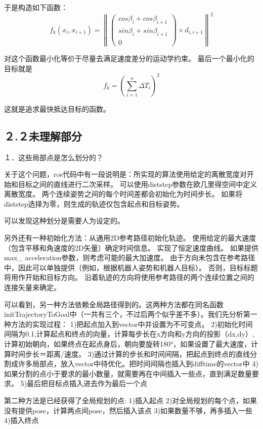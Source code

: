\documentclass[10pt,a4paper]{article}
\theoremstyle{mythm}
\numberwithin{equation}{section}
\begin{document}
于是构造如下函数：
\begin{equation}
f_k(x_i,x_{i+1})=\left\|
\left(
	\begin{array}{lr}
	cos\beta_i+cos\beta_{i+1}\\
	sin\beta_i+sin\beta_{i+1}\\
	0\end{array}
\right)\times d_{i,i+1}\right\|^2
\label{eq:point_constrain}
\end{equation}

对这个函数最小化等价于尽量去满足速度差分的运动学约束。
最后一个最小化的目标就是
$$
f_k=\left(\sum_{i=1}^{n}\Delta T_i\right)^2
$$

这就是追求最快抵达目标的函数。
\subsection{２.２未理解部分}
１．这些局部点是怎么划分的？

关于这个问题，ros代码中有一段说明是：所实现的算法使用给定的离散宽度对开始和目标之间的直线进行二次采样。 可以使用diststep参数在欧几里得空间中定义离散宽度。 两个连续姿势之间的每个时间差都会初始化为时间步长。 如果将diststep选择为零，则生成的轨迹仅包含起点和目标姿势。

可以发现这种划分是需要人为设定的。

另外还有一种初始化方法：从通用2D参考路径初始化轨迹。 使用给定的最大速度（包含平移和角速度的2D矢量）确定时间信息。 实现了恒定速度曲线。 如果提供max\_ acceleration参数，则考虑可能的最大加速度。 由于方向未包含在参考路径中，因此可以单独提供（例如，根据机器人姿势和机器人目标）。 否则，目标标题将用作开始和目标方向。 沿着轨迹的方向将使用参考路径的两个连续位置之间的连接矢量来确定。

可以看到，另一种方法依赖全局路径得到的。这两种方法都在同名函数initTrajectoryToGoal中（一共有三个，不过后两个似乎差不多）。我们先分析第一种方法的实现过程：
1)把起点加入到vector中并设置为不可变点。
2)初始化时间间隔为0.1,计算起点和终点的向量，计算每步长在x方向和y方向的投影（dx,dy）,计算初始朝向，如果终点在起点身后，朝向要旋转180°，如果设置了最大速度，计算时间步长＝距离/速度。
3)通过计算的步长和时间间隔，把起点到终点的直线分割成许多局部点，放入vector中待优化。把时间间隔也插入到difftime的vector中
4)如果分割的点小于要求的最小数量，就需要再在中间插入一些点，直到满足数量要求。
5)最后把目标点插入进去作为最后一个点

第二种方法是已经获得了全局规划的点:
1)插入起点
2)对全局规划的每个点，如果没有提供pose，计算两点间pose，然后插入该点
3)如果数量不够，再多插入一些
4)插入终点
\end{document}
